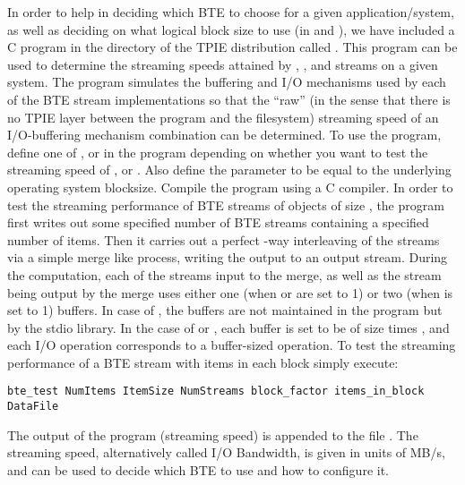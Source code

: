 In order to help in deciding which BTE to choose for a given
application/system, as well as deciding on what logical block size to use
(in  and ), we have included a C program in the
 directory of the TPIE distribution called .
This program can be used to determine the streaming speeds attained by
, , and  streams on a given
system. The program simulates the buffering and I/O mechanisms used by each
of the BTE stream implementations so that the ``raw'' (in the sense that
there is no TPIE layer between the program and the filesystem) streaming
speed of an I/O-buffering mechanism combination can be determined. To use
the program, define one of ,
 or 
in the program depending on whether you want to test the streaming speed of
,  or . Also define the
 parameter to be equal to the underlying operating
system blocksize. Compile the program using
a C compiler. In order to test the streaming performance of BTE streams of
objects of size , the program first writes out some
specified number  of BTE streams containing a specified
number  of items. Then it carries out a perfect
-way interleaving of the streams via a simple merge like
process, writing the output to an output stream. During the computation,
each of the  streams input to the merge, as well as the
stream being output by the merge uses either one (when
 or  are set to 1) or two (when
 is set to 1) buffers.  In case of , the
buffers are not maintained in the program but by the stdio library. In the
case of  or , each buffer is set to
be of size  times , and each I/O
operation corresponds to a buffer-sized operation. To test the streaming
performance of a BTE stream with  items in each block
simply execute:
\begin{verbatim}
bte_test NumItems ItemSize NumStreams block_factor items_in_block DataFile 
\end{verbatim}
The output of the program (streaming speed) is appended to the file
. The streaming speed, alternatively called I/O Bandwidth,
is given in units of MB/s, and can be used to decide which BTE to use and
how to configure it.

